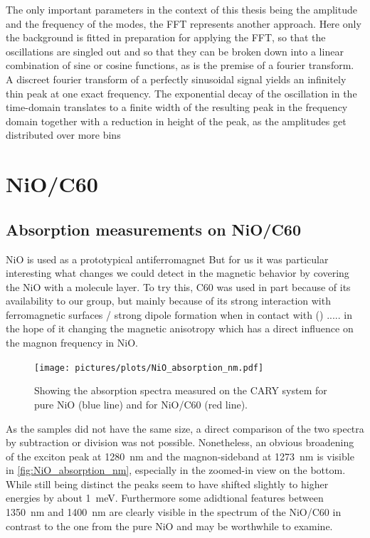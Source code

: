 The only important parameters in the context of this thesis being the amplitude and the frequency of the modes, the FFT represents another approach.
Here only the background is fitted in preparation for applying the FFT, so that the oscillations are singled out and so that they can be broken down into a linear combination of sine or cosine functions, as is the premise of a fourier transform.
A discreet fourier transform of a perfectly sinusoidal signal yields an infinitely thin peak at one exact frequency.
The exponential decay of the oscillation in the time-domain translates to a finite width of the resulting peak in the frequency domain together with a reduction in height of the peak, as the amplitudes get distributed over more bins


\section{NiO/C60}
\subsection{Absorption measurements on NiO/C60}
NiO is used as a prototypical antiferromagnet 
But for us it was particular interesting what changes we could detect in the magnetic behavior by covering the NiO with a molecule layer.
To try this, C60 was used in part because of its availability to our group, but mainly because of its strong interaction with ferromagnetic surfaces / strong dipole formation when in contact with () ..... in the hope of it changing the magnetic anisotropy which has a direct influence on the magnon frequency in NiO.
\begin{figure}[ht]
    \centering
    \texttt{[image: pictures/plots/NiO\_absorption\_nm.pdf]}
    \caption{Showing the absorption spectra measured on the CARY system for pure NiO (blue line) and for NiO/C60 (red line).}
    \label{fig:NiO_absorption_nm}
\end{figure}
\FloatBarrier
As the samples did not have the same size, a direct comparison of the two spectra by subtraction or division was not possible.
Nonetheless, an obvious broadening of the exciton peak at \qty{1280}{nm} and the magnon-sideband at \qty{1273}{nm} is visible in \autoref{fig:NiO_absorption_nm}, especially in the zoomed-in view on the bottom.
While still being distinct the peaks seem to have shifted slightly to higher energies by about \qty{1}{meV}.
Furthermore some adidtional features between \qty{1350}{nm} and \qty{1400}{nm} are clearly visible in the spectrum of the NiO/C60 in contrast to the one from the pure NiO and may be worthwhile to examine.

